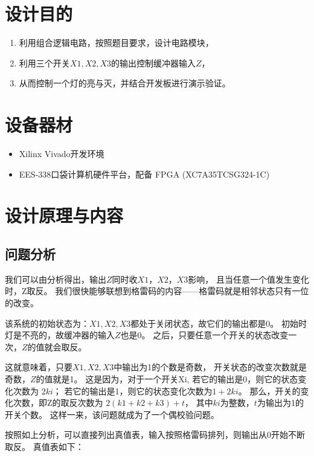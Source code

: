 \documentclass[UTF8]{article}
\begin{document}
\section{设计目的}
\begin{enumerate}
    \item 利用组合逻辑电路，按照题目要求，设计电路模块，
    \item 利用三个开关$X1,X2,X3$的输出控制缓冲器输入$Z$，
    \item 从而控制一个灯的亮与灭，并结合开发板进行演示验证。
\end{enumerate}

\section{设备器材}
\begin{itemize}
    \item Xilinx Vivado开发环境
    \item EES-338口袋计算机硬件平台，配备 FPGA (XC7A35TCSG324-1C)

\end{itemize}

\section{设计原理与内容}
\subsection{问题分析}

我们可以由分析得出，输出$Z$同时收$X1，X2，X3$影响，
且当任意一个值发生变化时，Z取反。
我们很快能够联想到格雷码的内容——格雷码就是相邻状态只有一位的改变。

该系统的初始状态为：$X1, X2, X3$都处于关闭状态，故它们的输出都是0。
初始时灯是不亮的，故缓冲器的输入$Z$也是0。
之后，只要任意一个开关的状态改变一次，$Z$的值就会取反。

这就意味着，只要$X1, X2, X3$中输出为1的个数是奇数，
开关状态的改变次数就是奇数，$Z$的值就是1。
这是因为，对于一个开关Xi, 若它的输出是0，则它的状态变化次数为 $2ki$；
若它的输出是1，则它的状态变化次数为$1 + 2ki$。
那么，开关的变化次数，即Z的取反次数为 $2 (k1 + k2 + k3 ) + t$，
其中$ki$为整数，$t$为输出为1的开关个数。
这样一来，该问题就成为了一个偶校验问题。


按照如上分析，可以直接列出真值表，输入按照格雷码排列，则输出从0开始不断取反。
真值表如下：
\end{document}
